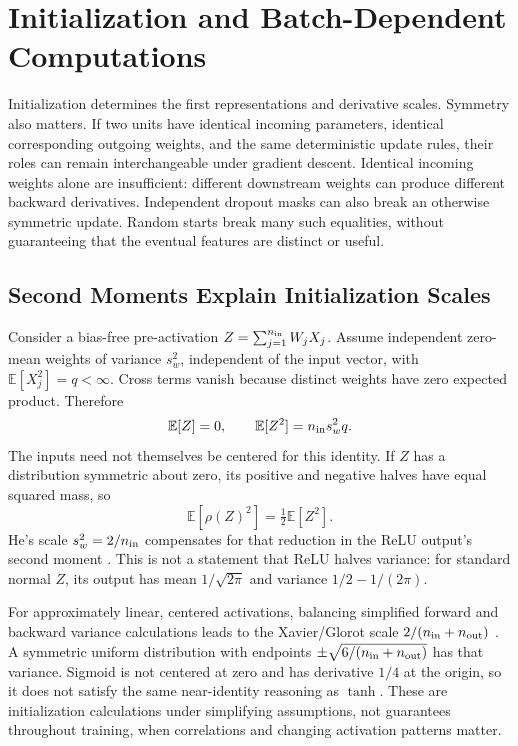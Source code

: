 \section{Initialization and Batch-Dependent Computations}

Initialization determines the first representations and derivative scales. Symmetry also matters. If two units have identical incoming parameters, identical corresponding outgoing weights, and the same deterministic update rules, their roles can remain interchangeable under gradient descent. Identical incoming weights alone are insufficient: different downstream weights can produce different backward derivatives. Independent dropout masks can also break an otherwise symmetric update. Random starts break many such equalities, without guaranteeing that the eventual features are distinct or useful.

\subsection{Second Moments Explain Initialization Scales}

Consider a bias-free pre-activation $Z=\sum_{j=1}^{n_{\rm in}}W_jX_j$. Assume independent zero-mean weights of variance $s_w^2$, independent of the input vector, with $\mathbb E[X_j^2]=q<\infty$. Cross terms vanish because distinct weights have zero expected product. Therefore
\[
\mathbb E[Z]=0,
\qquad\mathbb E[Z^2]=n_{\rm in}s_w^2q.
\]
The inputs need not themselves be centered for this identity. If $Z$ has a distribution symmetric about zero, its positive and negative halves have equal squared mass, so
\[
\mathbb E[\rho(Z)^2]=\tfrac12\mathbb E[Z^2].
\]
He's scale $s_w^2=2/n_{\rm in}$ compensates for that reduction in the ReLU output's second moment \citep{he2015rectifiers}. This is not a statement that ReLU halves variance: for standard normal $Z$, its output has mean $1/\sqrt{2\pi}$ and variance $1/2-1/(2\pi)$.

For approximately linear, centered activations, balancing simplified forward and backward variance calculations leads to the Xavier/Glorot scale $2/(n_{\rm in}+n_{\rm out})$ \citep{glorot2010initialization}. A symmetric uniform distribution with endpoints $\pm\sqrt{6/(n_{\rm in}+n_{\rm out})}$ has that variance. Sigmoid is not centered at zero and has derivative $1/4$ at the origin, so it does not satisfy the same near-identity reasoning as $\tanh$. These are initialization calculations under simplifying assumptions, not guarantees throughout training, when correlations and changing activation patterns matter.

